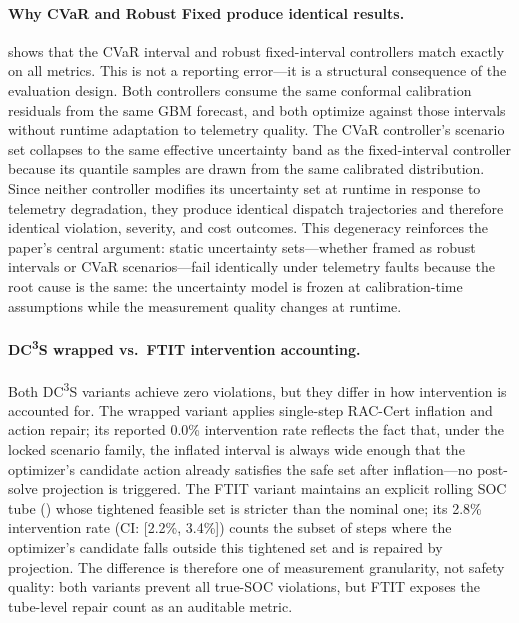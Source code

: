 \documentclass[11pt,a4paper]{article}
\begin{document}
\paragraph{Why CVaR and Robust Fixed produce identical results.}
 shows that the CVaR interval and robust fixed-interval controllers match exactly on all metrics. This is not a reporting error---it is a structural consequence of the evaluation design. Both controllers consume the same conformal calibration residuals from the same GBM forecast, and both optimize against those intervals without runtime adaptation to telemetry quality. The CVaR controller's scenario set collapses to the same effective uncertainty band as the fixed-interval controller because its quantile samples are drawn from the same calibrated distribution. Since neither controller modifies its uncertainty set at runtime in response to telemetry degradation, they produce identical dispatch trajectories and therefore identical violation, severity, and cost outcomes. This degeneracy reinforces the paper's central argument: static uncertainty sets---whether framed as robust intervals or CVaR scenarios---fail identically under telemetry faults because the root cause is the same: the uncertainty model is frozen at calibration-time assumptions while the measurement quality changes at runtime.

\paragraph{DC\textsuperscript{3}S wrapped vs.\ FTIT intervention accounting.}
Both DC\textsuperscript{3}S variants achieve zero violations, but they differ in how intervention is accounted for. The wrapped variant applies single-step RAC-Cert inflation and action repair; its reported 0.0\% intervention rate reflects the fact that, under the locked scenario family, the inflated interval is always wide enough that the optimizer's candidate action already satisfies the safe set after inflation---no post-solve projection is triggered. The FTIT variant maintains an explicit rolling SOC tube () whose tightened feasible set is stricter than the nominal one; its 2.8\% intervention rate (CI: [2.2\%, 3.4\%]) counts the subset of steps where the optimizer's candidate falls outside this tightened set and is repaired by projection. The difference is therefore one of measurement granularity, not safety quality: both variants prevent all true-SOC violations, but FTIT exposes the tube-level repair count as an auditable metric.
\end{document}
